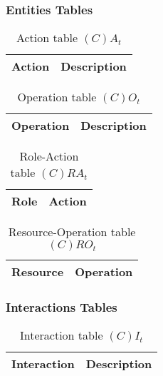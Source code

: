 \subsubsection*{Entities Tables}

\begin{table}[H]
	\centering
	\begin{tabular}{|p{4cm}|p{8cm}|}
			\hline
			\textbf{Action} & \textbf{Description} \\
			\hline
		\end{tabular}
	\caption{Action table $(C)A_t$}
	\label{tab:cat}
\end{table}

\begin{table}[H]
	\centering
	\begin{tabular}{|p{4cm}|p{8cm}|}
			\hline
			\textbf{Operation} & \textbf{Description} \\
			\hline
		\end{tabular}
	\caption{Operation table $(C)O_t$}
	\label{tab:cot}
\end{table}

\begin{table}[H]
	\centering
	\begin{tabular}{|p{4cm}|p{8cm}|}
			\hline
			\textbf{Role} & \textbf{Action} \\
			\hline
		\end{tabular}
	\caption{Role-Action table $(C)RA_t$}
	\label{tab:rat}
\end{table}

\begin{table}[H]
	\centering
	\begin{tabular}{|p{4cm}|p{8cm}|}
			\hline
			\textbf{Resource} & \textbf{Operation} \\
			\hline
		\end{tabular}
	\caption{Resource-Operation table $(C)RO_t$}
	\label{tab:crot}
\end{table}

\subsubsection*{Interactions Tables}

\begin{table}[H]
	\centering
	\begin{tabular}{|p{4cm}|p{8cm}|}
			\hline
			\textbf{Interaction} & \textbf{Description} \\
			\hline
		\end{tabular}
	\caption{Interaction table $(C)I_t$}
	\label{tab:cit}
\end{table}

